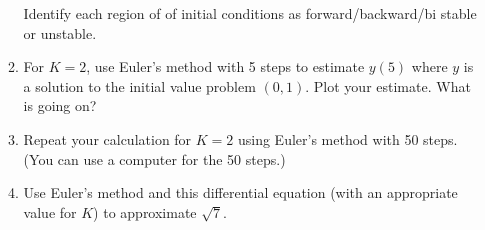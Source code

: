 \documentclass[letter]{article}
\begin{document}
\begin{enumerate}
\begin{enumerate}
				Identify each region of of initial conditions as forward/backward/bi stable or unstable.
			\item  For $K=2$, use Euler's method with 5 steps
				to estimate $y(5)$ where $y$ is a solution
				to the initial value problem $(0,1)$. Plot your estimate.  
				What is going on?
			\item Repeat your calculation for $K=2$ using Euler's method with 50 steps.
				(You can use a computer for the 50 steps.)

			\item Use Euler's method and this differential equation (with an appropriate value for $K$) to approximate
				$\sqrt{7}$.
		\end{enumerate}

	\end{enumerate}
\end{document}
